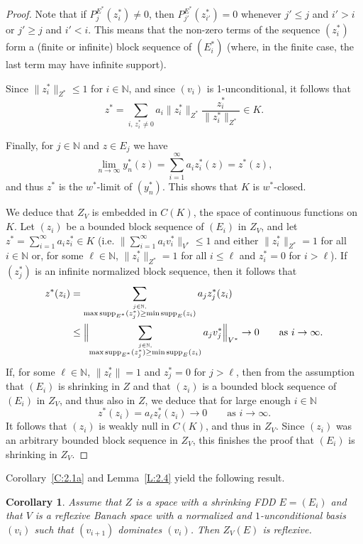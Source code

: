\documentclass[11pt,leqno]{amsart}
\newtheorem{cor}[thm]{Corollary}
\theoremstyle{definition}
\newtheorem*{remark}{Remark}
\newcommand{\N}{\mathbb{N}}
\newcommand{\supp}{{\rm supp}}
\begin{document}
\begin{proof}
  Note that if $P^{E^*}_j(z_i^*)\not=0$, then
  $P^{E^*}_{j'}(z_{i'}^*)=0$ whenever $j'\le j$ and $i'>i$ or $j'\ge
  j$ and $i'<i$. This means that the non-zero terms of the sequence
  $(z^*_i)$ form a (finite or infinite) block sequence of
  $(E^*_i)$ (where, in the finite case, the last term may have
  infinite support).

  Since $\|z^*_i\|_{Z^*}\le 1$ for $i\in\N$, and since $(v_i)$ is
  1-unconditional, it follows that $$z^*=\sum_{i,\,
  z^*_i\not=0} a_i \|z_i^*\|_{Z^*}\frac{z_i^*}{\|z_i^*\|_{Z^*}}\in K.$$

  Finally, for $j\in\N$ and $z\in E_j$ we have
  $$\lim_{n\to\infty} y^*_n(z)=  \sum_{i=1}^\infty a_i
  z_i^*(z)=z^*(z),$$
  and thus $z^*$ is the $w^*$-limit of $(y_n^*)$. This shows that
  $K$ is $w^*$-closed.
  
  We deduce that $Z_V$ is embedded in $C(K)$, the space of continuous
  functions on $K$. Let $(z_i)$ be a bounded block sequence of $(E_i)$
  in $Z_V$, and let $z^*=\sum_{i=1}^\infty a_i z_i^* \in K$
  (i.e. $\|\sum_{i=1}^\infty a_i v_i^*\|_{V^*}\le 1$ and  either
  $\|z_i^*\|_{Z^*}=1$ for all $i\in\N$ or, for some $\ell\in\N$,
  $\|z_i^*\|_{Z^*}=1$ for all $i\le\ell$ and $z_i^*=0$ for $i>\ell$).
  If $(z^*_j)$ is an infinite normalized block sequence, then it
  follows that
  \begin{align*}
    z^*(z_i)&=\sum_{\stackrel{j\in\N,}{\max\supp_{E^*}(z_j^*)\ge
	\min\supp_E(z_i)}} a_j z^*_j(z_i)\\
    &\le \Bigl\|\sum_{\stackrel{j\in\N,}{\max\supp_{E^*}(z_j^*)\ge
	\min\supp_E(z_i)}} a_j v^*_j\Bigr\|_{V^*}\to0\qquad \text{as
	}i\to
    \infty.
  \end{align*}
  If, for some $\ell\in\N$, $\|z^*_\ell\|=1$ and $z^*_j=0$ for
  $j>\ell$, then from the assumption that $(E_i)$ is shrinking in $Z$
  and that $(z_i)$ is a bounded block sequence of $(E_i)$ in $Z_V$,
  and thus also in $Z$, we deduce that for large enough $i\in\N$
  $$z^*(z_i)=a_\ell z_\ell^*(z_i)\to 0\qquad\text{as }i\to \infty.$$
  It follows that $(z_i)$ is weakly null in $C(K)$, and thus in
  $Z_V$. Since $(z_i)$ was an arbitrary bounded block sequence in
  $Z_V$, this finishes the proof that $(E_i)$ is shrinking in $Z_V$.
\end{proof}
Corollary~\ref{C:2.1a} and Lemma~\ref{L:2.4} yield the following result.
\begin{cor}
  \label{C:2.4a}
  Assume that $Z$ is a space with a shrinking FDD $E=(E_i)$ and that
  $V$ is a reflexive Banach space with a normalized and
  $1$-unconditional basis $(v_i)$ such that $(v_{i+1})$ dominates
  $(v_i)$. Then $Z_V(E)$ is reflexive.
\end{cor}
\end{document}
